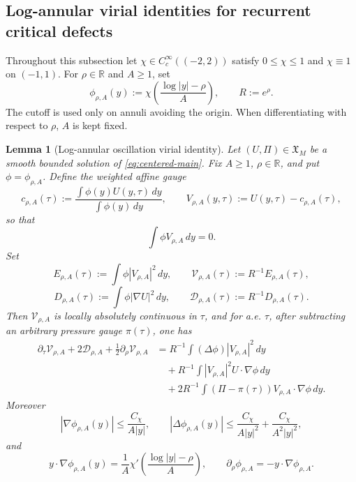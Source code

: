 \documentclass[11pt]{amsart}
\numberwithin{equation}{section}
\theoremstyle{plain}
\newtheorem{lemma}[lemma]{Lemma}
\theoremstyle{definition}
\theoremstyle{remark}
\begin{document}
\subsection{Log-annular virial identities for recurrent critical defects}
\label{subsec:log-annular-virial-critical-defects}

Throughout this subsection let
\(\chi\in C_c^\infty((-2,2))\) satisfy \(0\le\chi\le1\) and
\(\chi\equiv1\) on \((-1,1)\).  For \(\rho\in\mathbb R\) and \(A\ge1\), set
\[
   \phi_{\rho,A}(y)
   :=
   \chi\!\left(\frac{\log |y|-\rho}{A}\right),
   \qquad R:=e^\rho .
\]
The cutoff is used only on annuli avoiding the origin.  When differentiating
with respect to \(\rho\), \(A\) is kept fixed.

\begin{lemma}[Log-annular oscillation virial identity]
\label{lem:log-annular-oscillation-virial}
Let \((U,\Pi)\in\mathfrak X_M\) be a smooth bounded solution of
\eqref{eq:centered-main}.  Fix \(A\ge1\), \(\rho\in\mathbb R\), and put
\(\phi=\phi_{\rho,A}\).  Define the weighted affine gauge
\[
   c_{\rho,A}(\tau)
   :=
   \frac{\int \phi(y)U(y,\tau)\,dy}{\int \phi(y)\,dy},
   \qquad
   V_{\rho,A}(y,\tau):=U(y,\tau)-c_{\rho,A}(\tau),
\]
so that
\[
   \int \phi V_{\rho,A}\,dy=0 .
\]
Set
\[
   E_{\rho,A}(\tau):=\int \phi |V_{\rho,A}|^2\,dy,
   \qquad
   \mathcal V_{\rho,A}(\tau):=R^{-1}E_{\rho,A}(\tau),
\]
\[
   D_{\rho,A}(\tau):=\int \phi |\nabla U|^2\,dy,
   \qquad
   \mathcal D_{\rho,A}(\tau):=R^{-1}D_{\rho,A}(\tau).
\]
Then \(\mathcal V_{\rho,A}\) is locally absolutely continuous in \(\tau\), and
for a.e. \(\tau\), after subtracting an arbitrary pressure gauge \(\pi(\tau)\),
one has
\begin{equation}
\label{eq:log-annular-virial-identity}
\begin{aligned}
   \partial_\tau \mathcal V_{\rho,A}
   +2\mathcal D_{\rho,A}
   +\frac12\partial_\rho \mathcal V_{\rho,A}
   &=
   R^{-1}\int (\Delta\phi)|V_{\rho,A}|^2\,dy                         \\
   &\quad
   +R^{-1}\int |V_{\rho,A}|^2U\cdot\nabla\phi\,dy                    \\
   &\quad
   +2R^{-1}\int (\Pi-\pi(\tau))V_{\rho,A}\cdot\nabla\phi\,dy .
\end{aligned}
\end{equation}
Moreover
\begin{equation}
\label{eq:log-cutoff-derivative-bounds}
   |\nabla\phi_{\rho,A}(y)|\le \frac{C_\chi}{A|y|},
   \qquad
   |\Delta\phi_{\rho,A}(y)|\le
   \frac{C_\chi}{A|y|^2}+\frac{C_\chi}{A^2|y|^2},
\end{equation}
and
\[
   y\cdot\nabla\phi_{\rho,A}(y)
   =
   \frac1A\chi'\!\left(\frac{\log |y|-\rho}{A}\right),
   \qquad
   \partial_\rho\phi_{\rho,A}=-y\cdot\nabla\phi_{\rho,A}.
\]
\end{lemma}
\end{document}
